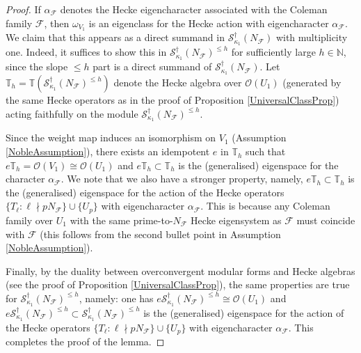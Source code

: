 \documentclass[10pt, oneside]{amsart}
\numberwithin{equation}{subsection}
\theoremstyle{definition}
\theoremstyle{remark}
\newcommand{\mbb}[1]{\mathbb{#1}}
\begin{document}
\begin{proof}
If $\alpha_{\mathcal{F}}$ denotes the Hecke eigencharacter associated with the Coleman family $\mathcal{F}$, then $\omega_{V_1}$ is an eigenclass for the Hecke action with eigencharacter $\alpha_{\mathcal{F}}$. We claim that this appears as a direct summand in $\mathscr{S}^{\dagger}_{\kappa_1}(N_{\mathcal{F}})$ with multiplicity one. Indeed, it suffices to show this in $\mathscr{S}^{\dagger}_{\kappa_1}(N_{\mathcal{F}})^{\leq h}$ for sufficiently large $h \in \mbb{N}$, since the slope $\leq h$ part is a direct summand of $\mathscr{S}^{\dagger}_{\kappa_1}(N_{\mathcal{F}})$. Let $\mbb{T}_h = \mbb{T}(\mathscr{S}^{\dagger}_{\kappa_1}(N_{\mathcal{F}})^{\leq h})$ denote the Hecke algebra over $\mathcal{O}(U_1)$ (generated by the same Hecke operators as in the proof of Proposition \ref{UniversalClassProp}) acting faithfully on the module $\mathscr{S}^{\dagger}_{\kappa_1}(N_{\mathcal{F}})^{\leq h}$. 

Since the weight map induces an isomorphism on $V_1$ (Assumption \ref{NobleAssumption}), there exists an idempotent $e$ in $\mbb{T}_h$ such that $e\mbb{T}_h = \mathcal{O}(V_1) \cong \mathcal{O}(U_1)$ and $e\mbb{T}_h \subset \mbb{T}_h$ is the (generalised) eigenspace for the character $\alpha_{\mathcal{F}}$. We note that we also have a stronger property, namely, $e \mbb{T}_h \subset \mbb{T}_h$ is the (generalised) eigenspace for the action of the Hecke operators $\{ T_{\ell} : \ell \nmid p N_{\mathcal{F}} \} \cup \{U_p \}$ with eigencharacter $\alpha_{\mathcal{F}}$. This is because any Coleman family over $U_1$ with the same prime-to-$N_{\mathcal{F}}$ Hecke eigensystem as $\mathcal{F}$ must coincide with $\mathcal{F}$ (this follows from the second bullet point in Assumption \ref{NobleAssumption}).

Finally, by the duality between overconvergent modular forms and Hecke algebras (see the proof of Proposition \ref{UniversalClassProp}), the same properties are true for $\mathscr{S}^{\dagger}_{\kappa_1}(N_{\mathcal{F}})^{\leq h}$, namely: one has $e \mathscr{S}^{\dagger}_{\kappa_1}(N_{\mathcal{F}})^{\leq h} \cong \mathcal{O}(U_1)$ and $e \mathscr{S}^{\dagger}_{\kappa_1}(N_{\mathcal{F}})^{\leq h} \subset \mathscr{S}^{\dagger}_{\kappa_1}(N_{\mathcal{F}})^{\leq h}$ is the (generalised) eigenspace for the action of the Hecke operators $\{ T_{\ell} : \ell \nmid p N_{\mathcal{F}} \} \cup \{U_p \}$ with eigencharacter $\alpha_{\mathcal{F}}$. This completes the proof of the lemma. 
\end{proof}
\end{document}
